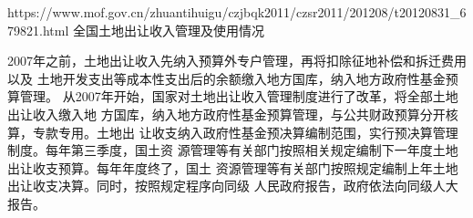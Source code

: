 https://www.mof.gov.cn/zhuantihuigu/czjbqk2011/czsr2011/201208/t20120831_679821.html
全国土地出让收入管理及使用情况

2007年之前，土地出让收入先纳入预算外专户管理，再将扣除征地补偿和拆迁费用以及
土地开发支出等成本性支出后的余额缴入地方国库，纳入地方政府性基金预算管理。
从2007年开始，国家对土地出让收入管理制度进行了改革，将全部土地出让收入缴入地
方国库，纳入地方政府性基金预算管理，与公共财政预算分开核算，专款专用。土地出
让收支纳入政府性基金预决算编制范围，实行预决算管理制度。每年第三季度，国土资
源管理等有关部门按照相关规定编制下一年度土地出让收支预算。每年年度终了，国土
资源管理等有关部门按照规定编制上年土地出让收支决算。同时，按照规定程序向同级
人民政府报告，政府依法向同级人大报告。






